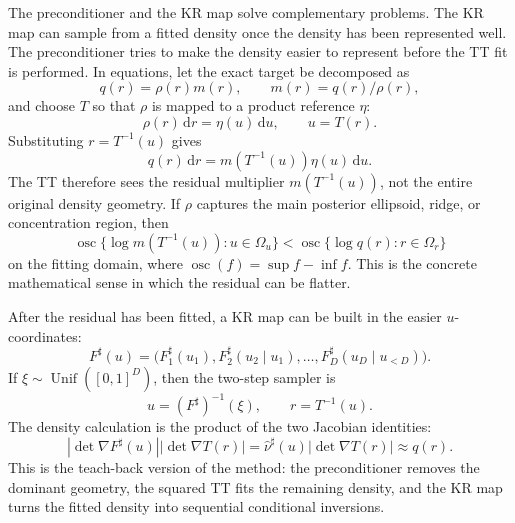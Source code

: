 \documentclass[11pt]{article}
\numberwithin{equation}{section}
\newcommand{\dd}{\,\mathrm d}
\begin{document}
The preconditioner and the KR map solve complementary problems.  The KR map
can sample from a fitted density once the density has been represented well.
The preconditioner tries to make the density easier to represent before the TT
fit is performed.  In equations, let the exact target be decomposed as
\begin{equation}
    q(r)=\rho(r)m(r),
    \qquad m(r)=q(r)/\rho(r),
    \label{eq:p26-prec-teach-1}
\end{equation}
and choose \(T\) so that \(\rho\) is mapped to a product reference \(\eta\):
\begin{equation}
    \rho(r)\dd r
    =
    \eta(u)\dd u,
    \qquad u=T(r).
    \label{eq:p26-prec-teach-2}
\end{equation}
Substituting \(r=T^{-1}(u)\) gives
\begin{equation}
    q(r)\dd r
    =
    m(T^{-1}(u))\eta(u)\dd u.
    \label{eq:p26-prec-teach-3}
\end{equation}
The TT therefore sees the residual multiplier \(m(T^{-1}(u))\), not the
entire original density geometry.  If \(\rho\) captures the main posterior
ellipsoid, ridge, or concentration region, then
\begin{equation}
    \operatorname{osc}\{\log m(T^{-1}(u)):u\in\Omega_u\}
    <
    \operatorname{osc}\{\log q(r):r\in\Omega_r\}
    \label{eq:p26-prec-teach-4}
\end{equation}
on the fitting domain, where \(\operatorname{osc}(f)=\sup f-\inf f\).  This is
the concrete mathematical sense in which the residual can be flatter.

After the residual has been fitted, a KR map can be built in the easier
\(u\)-coordinates:
\begin{equation}
    F^\sharp(u)
    =
    \bigl(F^\sharp_1(u_1),
    F^\sharp_2(u_2\mid u_1),\ldots,
    F^\sharp_D(u_D\mid u_{<D})\bigr).
    \label{eq:p26-prec-teach-5}
\end{equation}
If \(\xi\sim\operatorname{Unif}([0,1]^D)\), then the two-step sampler is
\begin{equation}
    u=(F^\sharp)^{-1}(\xi),
    \qquad
    r=T^{-1}(u).
    \label{eq:p26-prec-teach-6}
\end{equation}
The density calculation is the product of the two Jacobian identities:
\begin{equation}
    \left|\det\nabla F^\sharp(u)\right|
    \left|\det\nabla T(r)\right|
    =
    \widehat\nu^\sharp(u)
    \left|\det\nabla T(r)\right|
    \approx q(r).
    \label{eq:p26-prec-teach-7}
\end{equation}
This is the teach-back version of the method: the preconditioner removes the
dominant geometry, the squared TT fits the remaining density, and the KR map
turns the fitted density into sequential conditional inversions.
\end{document}
